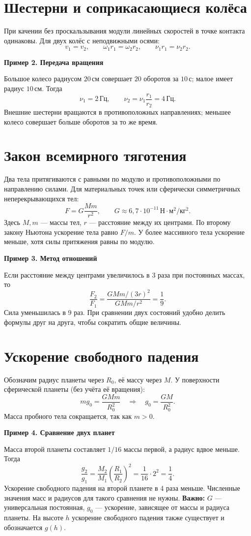 \documentclass[a4paper,12pt]{article}
\newcommand{\key}[1]{\textcolor{darkaccent}{\textbf{#1}}}
\newcommand{\unit}[1]{\,\text{#1}}
\newcommand{\ex}[1]{\par\medskip\textbf{#1}\par}
\begin{document}
\section{Шестерни и соприкасающиеся колёса}
При качении без проскальзывания модули линейных скоростей в точке контакта одинаковы. Для двух колёс с неподвижными осями:
\[v_1=v_2,\qquad \omega_1r_1=\omega_2r_2,\qquad \nu_1r_1=\nu_2r_2.\]
\begin{center}
\end{center}
\ex{Пример 2. Передача вращения}
Большое колесо радиусом $20\unit{см}$ совершает $20$ оборотов за $10\unit{с}$; малое имеет радиус $10\unit{см}$. Тогда
\[\nu_1=2\unit{Гц},\qquad \nu_2=\nu_1\frac{r_1}{r_2}=4\unit{Гц}.\]
Внешние шестерни вращаются в противоположных направлениях; меньшее колесо совершает больше оборотов за то же время.
\clearpage
\section{Закон всемирного тяготения}
Два тела притягиваются с равными по модулю и противоположными по направлению силами. Для материальных точек или сферически симметричных неперекрывающихся тел:
\[\boxed{F=G\frac{Mm}{r^2}},\qquad G\approx 6{,}7\cdot10^{-11}\unit{Н}\cdot\text{м}^2/\text{кг}^2.\]
Здесь $M,m$ --- массы тел, $r$ --- расстояние между их центрами. По второму закону Ньютона ускорение тела равно $F/m$. У более массивного тела ускорение меньше, хотя силы притяжения равны по модулю.
\ex{Пример 3. Метод отношений}
Если расстояние между центрами увеличилось в 3 раза при постоянных массах, то
\[\frac{F_2}{F_1}=\frac{GMm/(3r)^2}{GMm/r^2}=\frac19.\]
Сила уменьшилась в 9 раз. При сравнении двух состояний удобно делить формулы друг на друга, чтобы сократить общие величины.
\section{Ускорение свободного падения}
Обозначим радиус планеты через $R_0$, её массу через $M$. У поверхности сферической планеты (без учёта её вращения):
\[mg_0=\frac{GMm}{R_0^2}\quad\Longrightarrow\quad \boxed{g_0=\frac{GM}{R_0^2}}.\]
Масса пробного тела сокращается, так как $m>0$.
\ex{Пример 4. Сравнение двух планет}
Масса второй планеты составляет $1/16$ массы первой, а радиус вдвое меньше. Тогда
\[\frac{g_2}{g_1}=\frac{M_2}{M_1}\left(\frac{R_1}{R_2}\right)^2=\frac1{16}\cdot 2^2=\frac14.\]
Ускорение свободного падения на второй планете в 4 раза меньше. Численные значения масс и радиусов для такого сравнения не нужны.
\key{Важно:} $G$ --- универсальная постоянная, $g_0$ --- ускорение, зависящее от массы и радиуса планеты. На высоте $h$ ускорение свободного падения также существует и обозначается $g(h)$.
\clearpage
\end{document}
